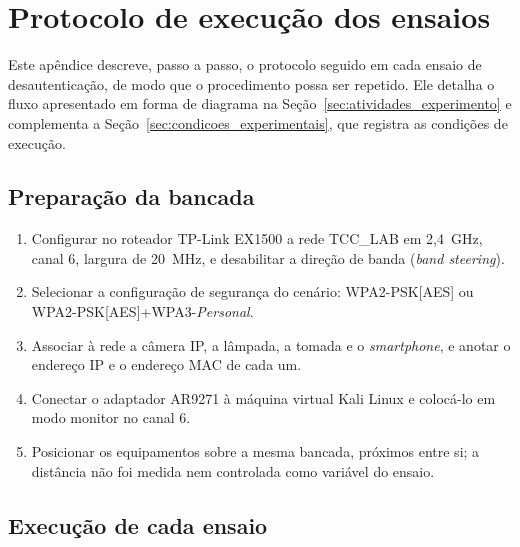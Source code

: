 
\chapter{Protocolo de execução dos ensaios}
\label{sec:protocolo}

Este apêndice descreve, passo a passo, o protocolo seguido em cada ensaio de desautenticação, de modo que o procedimento possa ser repetido. Ele detalha o fluxo apresentado em forma de diagrama na Seção~\ref{sec:atividades_experimento} e complementa a Seção~\ref{sec:condicoes_experimentais}, que registra as condições de execução.

\section{Preparação da bancada}

\begin{enumerate}
    \item Configurar no roteador TP-Link EX1500 a rede TCC\_LAB em 2,4~GHz, canal 6, largura de 20~MHz, e desabilitar a direção de banda (\textit{band steering}).
    \item Selecionar a configuração de segurança do cenário: WPA2-PSK[AES] ou WPA2-PSK[AES]+WPA3-\textit{Personal}.
    \item Associar à rede a câmera IP, a lâmpada, a tomada e o \textit{smartphone}, e anotar o endereço IP e o endereço MAC de cada um.
    \item Conectar o adaptador AR9271 à máquina virtual Kali Linux e colocá-lo em modo monitor no canal 6.
    \item Posicionar os equipamentos sobre a mesma bancada, próximos entre si; a distância não foi medida nem controlada como variável do ensaio.
\end{enumerate}

\section{Execução de cada ensaio}

